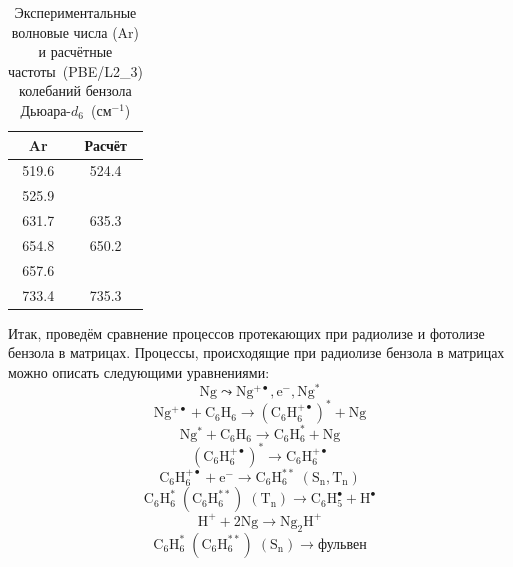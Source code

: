 { \begin{table}[H]
\caption{Экспериментальные волновые числа (Ar) и расчётные частоты~(PBE/L2\_3) колебаний бензола Дьюара-$d_6$~(см$^{-1}$)}
\label{Dewar_fr}
\begin{center}
\begin{tabular}{cc}
Ar &  Расчёт \\
\hline
519.6 & 524.4\\
525.9 & \\
631.7 & 635.3\\
654.8 & 650.2\\
657.6 & \\
733.4 & 735.3\\
\end{tabular}
\end{center}
\end{table}


Итак, проведём сравнение процессов протекающих при радиолизе и фотолизе бензола в матрицах. 
Процессы, происходящие при радиолизе бензола в матрицах можно описать следующими уравнениями:
\vspace{-2ex}
\begin{equation}\label{eq1_}
\mathrm{ 
Ng \leadsto Ng^{+\bullet}, e^-, Ng^*}
\end{equation}
\begin{equation}\label{eq2_}
\mathrm{
Ng^{+\bullet} + C_6H_6  \to (C_6H_6^{+\bullet})^* + Ng}
\end{equation}
\begin{equation}\label{eq3_}
\mathrm{
Ng^* + C_6H_6   \to C_6H_6^*  + Ng}
\end{equation}
\begin{equation}\label{eq4_}
\mathrm{
(C_6H_6^{+\bullet})^*  \to C_6H_6^{+\bullet} }
\end{equation}
\begin{equation}\label{eq6_}
\mathrm{
C_6H_6^{+\bullet}   + e^- \to C_6H_6^{**} \;(S_n, T_n)}
\end{equation}
\begin{equation}\label{eq7_}
\mathrm{
C_6H_6^*\;(C_6H_6^{**})\; (T_n)\to C_6H_5^\bullet + H^\bullet}
\end{equation}
\begin{equation}\label{eq8__}
\mathrm{
H^+ + 2Ng \to Ng_2H^+}
\end{equation}
\begin{equation}\label{eq9_}
\mathrm{
C_6H_6^*  \; (C_6H_6^{**}) \;(S_n) \to \text{фульвен}}
\end{equation}

}
